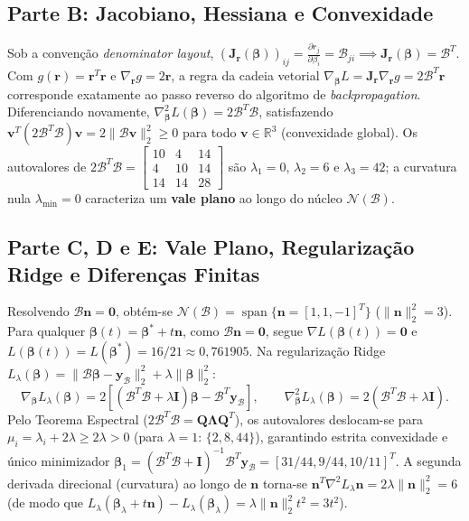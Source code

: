 \documentclass[11pt,a4paper]{article}
\begin{document}
\subsection{Parte B: Jacobiano, Hessiana e Convexidade}
Sob a convenção \textit{denominator layout}, $(\mathbf{J}_{\mathbf{r}}(\boldsymbol{\beta}))_{ij} = \frac{\partial r_j}{\partial \beta_i} = \mathcal{B}_{ji} \implies \mathbf{J}_{\mathbf{r}}(\boldsymbol{\beta}) = \mathcal{B}^T$. Com $g(\mathbf{r}) = \mathbf{r}^T\mathbf{r}$ e $\nabla_{\mathbf{r}}g = 2\mathbf{r}$, a regra da cadeia vetorial $\nabla_{\boldsymbol{\beta}}L = \mathbf{J}_{\mathbf{r}}\nabla_{\mathbf{r}}g = 2\mathcal{B}^T\mathbf{r}$ corresponde exatamente ao passo reverso do algoritmo de \textit{backpropagation}. Diferenciando novamente, $\nabla^2_{\boldsymbol{\beta}} L(\boldsymbol{\beta}) = 2\mathcal{B}^T\mathcal{B}$, satisfazendo $\mathbf{v}^T(2\mathcal{B}^T\mathcal{B})\mathbf{v} = 2\|\mathcal{B}\mathbf{v}\|_2^2 \ge 0$ para todo $\mathbf{v} \in \mathbb{R}^3$ (convexidade global). Os autovalores de $2\mathcal{B}^T\mathcal{B} = \begin{bmatrix} 10 & 4 & 14 \\ 4 & 10 & 14 \\ 14 & 14 & 28 \end{bmatrix}$ são $\lambda_1 = 0$, $\lambda_2 = 6$ e $\lambda_3 = 42$; a curvatura nula $\lambda_{\min} = 0$ caracteriza um \textbf{vale plano} ao longo do núcleo $\mathcal{N}(\mathcal{B})$.

\subsection{Parte C, D e E: Vale Plano, Regularização Ridge e Diferenças Finitas}
Resolvendo $\mathcal{B}\mathbf{n} = \mathbf{0}$, obtém-se $\mathcal{N}(\mathcal{B}) = \operatorname{span}\{\mathbf{n} = [1, 1, -1]^T\}$ ($\|\mathbf{n}\|_2^2 = 3$). Para qualquer $\boldsymbol{\beta}(t) = \boldsymbol{\beta}^* + t\mathbf{n}$, como $\mathcal{B}\mathbf{n} = \mathbf{0}$, segue $\nabla L(\boldsymbol{\beta}(t)) = \mathbf{0}$ e $L(\boldsymbol{\beta}(t)) = L(\boldsymbol{\beta}^*) = 16/21 \approx 0{,}761905$.
Na regularização Ridge $L_\lambda(\boldsymbol{\beta}) = \|\mathcal{B}\boldsymbol{\beta}-\mathbf{y}_{\mathcal{B}}\|_2^2 + \lambda\|\boldsymbol{\beta}\|_2^2$:
\[
\nabla_{\boldsymbol{\beta}}L_\lambda(\boldsymbol{\beta}) = 2\left[(\mathcal{B}^T\mathcal{B} + \lambda\mathbf{I})\boldsymbol{\beta} - \mathcal{B}^T\mathbf{y}_{\mathcal{B}}\right], \qquad
\nabla^2_{\boldsymbol{\beta}}L_\lambda(\boldsymbol{\beta}) = 2(\mathcal{B}^T\mathcal{B} + \lambda\mathbf{I}).
\]
Pelo Teorema Espectral ($2\mathcal{B}^T\mathcal{B} = \mathbf{Q}\boldsymbol{\Lambda}\mathbf{Q}^T$), os autovalores deslocam-se para $\mu_i = \lambda_i + 2\lambda \ge 2\lambda > 0$ (para $\lambda=1$: $\{2, 8, 44\}$), garantindo estrita convexidade e único minimizador $\boldsymbol{\beta}_1 = (\mathcal{B}^T\mathcal{B}+\mathbf{I})^{-1}\mathcal{B}^T\mathbf{y}_{\mathcal{B}} = [31/44, 9/44, 10/11]^T$. A segunda derivada direcional (curvatura) ao longo de $\mathbf{n}$ torna-se $\mathbf{n}^T\nabla^2 L_\lambda \mathbf{n} = 2\lambda\|\mathbf{n}\|_2^2 = 6$ (de modo que $L_\lambda(\boldsymbol{\beta}_\lambda + t\mathbf{n}) - L_\lambda(\boldsymbol{\beta}_\lambda) = \lambda\|\mathbf{n}\|_2^2 t^2 = 3t^2$).
\end{document}
